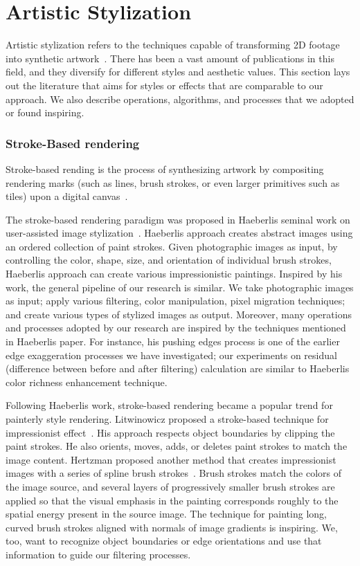 \section{Artistic Stylization}\label{bg:Artistic Stylization}

Artistic stylization refers to the techniques capable of transforming 2D footage into synthetic artwork~\cite{NPRbook}. There has been a vast amount of publications in this field, and they diversify for different styles and aesthetic values. This section lays out the literature that aims for styles or effects that are comparable to our approach. We also describe operations, algorithms, and processes that we adopted or found inspiring.

\subsubsection{Stroke-Based rendering}
Stroke-based rending is the process of synthesizing artwork by compositing rendering marks (such as lines, brush strokes, or even larger primitives such as tiles) upon a digital canvas~\cite{NPRbook}. 

The stroke-based rendering paradigm was proposed in Haeberli\textquotesingle s seminal work on user-assisted image stylization~\cite{Hae:stroke}. Haeberli\textquotesingle s approach creates abstract images using an ordered collection of paint strokes. Given photographic images as input, by controlling the color, shape, size, and orientation of individual brush strokes, Haeberli\textquotesingle s approach can create various impressionistic paintings. Inspired by his work, the general pipeline of our research is similar. We take photographic images as input; apply various filtering, color manipulation, pixel migration techniques; and create various types of stylized images as output. Moreover, many operations and processes adopted by our research are inspired by the techniques mentioned in Haeberli\textquotesingle s paper. For instance, his pushing edges process is one of the earlier edge exaggeration processes we have investigated; our experiments on residual (difference between before and after filtering) calculation are similar to Haeberli\textquotesingle s color richness enhancement technique.

Following Haeberli\textquotesingle s work, stroke-based rendering became a popular trend for painterly style rendering. Litwinowicz proposed a stroke-based technique for impressionist effect~\cite{Litwinowicz}. His approach respects object boundaries by clipping the paint strokes. He also orients, moves, adds, or deletes paint strokes to match the image content. Hertzman proposed another method that creates impressionist images with a series of spline brush strokes~\cite{Hertzmann:1998}. Brush strokes match the colors of the image source, and several layers of progressively smaller brush strokes are applied so that the visual emphasis in the painting corresponds roughly to the spatial energy present in the source image. The technique for painting long, curved brush strokes aligned with normals of image gradients is inspiring. We, too, want to recognize object boundaries or edge orientations and use that information to guide our filtering processes.

